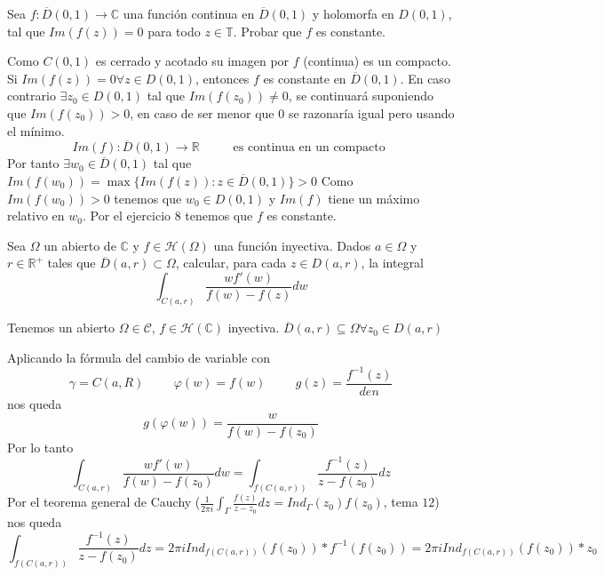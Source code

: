 \begin{ejer}
	Sea $f:\overline{D}(0,1)\rightarrow\mathbb{C}$ una función continua en $\overline{D}(0,1)$ y holomorfa en $D(0,1)$, tal que $Im(f(z)) = 0$ para todo $z\in\mathbb{T}$.
	Probar que $f$ es constante.
\end{ejer}
\begin{sol}
	Como $C(0,1)$ es cerrado y acotado su imagen por $f$ (continua) es un compacto.
	Si $Im(f(z))=0 	\forall z\in D(0,1)$, entonces $f$ es constante en $\overline{D}(0,1)$.
	En caso contrario $\exists z_0 \in D(0,1)$ tal que $Im(f(z_0)) \not=0$, se continuará suponiendo que $Im(f(z_0))>0$, en caso de ser menor que $0$ se razonaría igual pero usando el mínimo.
	$$Im(f):\overline{D}(0,1)\rightarrow \mathbb{R} \hspace{1cm} \text{ es continua en un compacto }$$
	Por tanto $\exists w_0\in\overline{D}(0,1)$ tal que $Im(f(w_0)) = \max\{ Im(f(z)) : z\in\overline{D}(0,1) \} > 0$
	Como $Im(f(w_0))>0$ tenemos que $w_0\in D(0,1)$ y $Im(f)$ tiene un máximo relativo en $w_0$.
	Por el ejercicio $8$ tenemos que $f$ es constante.
\end{sol}


\begin{ejer}
	Sea $\Omega$ un abierto de $\mathbb{C}$ y $f\in\mathcal{H}(\Omega)$ una función inyectiva. 
	Dados $a\in\Omega$ y $r\in\mathbb{R}^+$ tales que $\overline{D}(a,r)\subset\Omega$, calcular, para cada $z\in D(a,r)$, la integral
	$$ \int_{C(a,r)} \frac{wf'(w)}{f(w)-f(z)} dw $$
\end{ejer}
\begin{sol}
	Tenemos un abierto $\Omega\in\mathcal{C}$, $f\in\mathcal{H}(\mathbb{C})$ inyectiva.
	$\overline{D}(a,r) \subseteq \Omega \forall z_0\in D(a,r)$
	
	Aplicando la fórmula del cambio de variable con 
	$$\gamma = C(a,R)\hspace{1cm} \varphi(w) = f(w) \hspace{1cm} g(z) = \frac{f^{-1}(z)}{den}$$
	nos queda
	$$g(\varphi(w)) = \frac{w}{f(w)-f(z_0)}$$
	Por lo tanto
	$$\int_{C(a,r)} \frac{wf'(w)}{f(w)-f(z_0)} dw = \int_{f(C(a,r))} \frac{f^{-1}(z)}{z-f(z_0)} dz$$
	Por el teorema general de Cauchy ($\frac{1}{2\pi i} \int_{\Gamma}\frac{f(z)}{z-z_0} dz = Ind_{\Gamma} (z_0)f(z_0)$, tema $12$) nos queda
	$$\int_{f(C(a,r))} \frac{f^{-1}(z)}{z-f(z_0)} dz = 2\pi i Ind_{f(C(a,r))} (f(z_0)) * f^{-1}(f(z_0)) = 2\pi i Ind_{f(C(a,r))} (f(z_0)) * z_0$$
\end{sol}


\newpage

